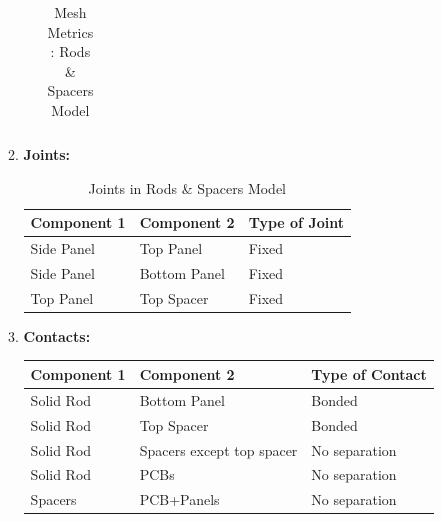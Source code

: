 \documentclass[../../main.tex]{subfiles}
\begin{document}
\begin{enumerate}
\begin{enumerate}
\begin{enumerate}
\begin{table}[H]
\begin{tabular}{|p{3.5cm}|p{3.5cm}|p{3cm}|}
                   \hline
                \end{tabular}
                \caption{Mesh Metrics : Rods \& Spacers Model}
                \label{tab:my_label}
            \end{table}
            \end{enumerate}
            \item \textbf{Joints: } 
            \begin{table}[H]
                \centering
                \begin{tabular}{|p{3cm}|p{3cm}|p{3cm}|}
                    \hline
                    \textbf{Component 1} & \textbf{Component 2} & \textbf{Type of Joint} \\
                    \hline
                   Side Panel & Top Panel & Fixed  \\
                    \hline
                    Side Panel & Bottom Panel & Fixed \\
                    \hline
                    Top Panel & Top Spacer & Fixed \\
                   \hline
                \end{tabular}
                \caption{Joints in Rods \& Spacers Model}
                \label{tab:my_label}
            \end{table}
            \item \textbf{Contacts: }
            \begin{table}[H]
                \centering
                            \begin{tabular}{|p{3cm}|p{5cm}|p{3cm}|}
                    \hline
                    \textbf{Component 1} & \textbf{Component 2} & \textbf{Type of Contact} \\
                    \hline
                   Solid Rod & Bottom Panel& Bonded \\
                    \hline
                    Solid Rod & Top Spacer & Bonded \\
                    \hline
                    Solid Rod & Spacers except top spacer & No separation \\
                    \hline
                    Solid Rod & PCBs & No separation \\
                    \hline
                    Spacers & PCB+Panels & No separation \\
                    \hline


\end{tabular}
\end{table}
\end{enumerate}
\end{enumerate}
\end{document}
